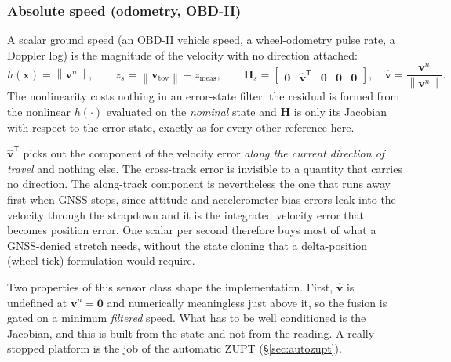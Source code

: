 \documentclass[11pt,a4paper]{article}
\newcommand{\vect}[1]{\bm{#1}}
\newcommand{\mat}[1]{\bm{#1}}
\newcommand{\T}{^{\mathsf{T}}}
\newcommand{\nframe}{n}
\begin{document}
\subsubsection{Absolute speed (odometry, OBD-II)}
\label{sec:speed}

A scalar ground speed (an OBD-II vehicle speed, a wheel-odometry pulse
rate, a Doppler log) is the magnitude of the velocity with no direction
attached:
\begin{equation}
  h(\vect{x}) = \left\lVert \vect{v}^\nframe \right\rVert , \qquad
  z_s = \left\lVert \vect{v}_{\text{tov}} \right\rVert - z_{\text{meas}} , \qquad
  \mat{H}_s =
  \begin{bmatrix}
    \mat{0} & \hat{\vect{v}}\T & \mat{0} & \mat{0} & \mat{0}
  \end{bmatrix},
  \quad
  \hat{\vect{v}} = \frac{\vect{v}^\nframe}{\left\lVert \vect{v}^\nframe \right\rVert} .
\end{equation}
The nonlinearity costs nothing in an error-state filter: the residual is
formed from the nonlinear $h(\cdot)$ evaluated on the \emph{nominal}
state and $\mat{H}$ is only its Jacobian with respect to the error state,
exactly as for every other reference here.

$\hat{\vect{v}}\T$ picks out the component of the velocity error \emph{along the
current direction of travel} and nothing else. The cross-track error is
invisible to a quantity that carries no direction. The along-track component is
nevertheless the one that runs away first when GNSS stops, since attitude and
accelerometer-bias errors leak into the velocity through the strapdown and it is
the integrated velocity error that becomes position error. One scalar per second
therefore buys most of what a GNSS-denied stretch needs, without the state
cloning that a delta-position (wheel-tick) formulation would require.

Two properties of this sensor class shape the implementation. First,
$\hat{\vect{v}}$ is undefined at $\vect{v}^\nframe = \vect{0}$ and numerically
meaningless just above it, so the fusion is gated on a minimum \emph{filtered}
speed. What has to be well conditioned is the Jacobian, and this is built from
the state and not from the reading. A really stopped platform is the job of
the automatic ZUPT (\S\ref{sec:autozupt}).
\end{document}
